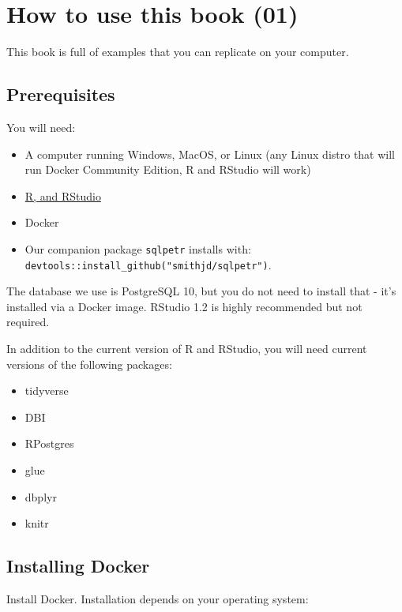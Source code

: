 \documentclass[]{book}
\providecommand{\tightlist}{%
  \setlength{\itemsep}{0pt}\setlength{\parskip}{0pt}}
\theoremstyle{definition}
\theoremstyle{definition}
\theoremstyle{definition}
\theoremstyle{remark}
\begin{document}
\hypertarget{how-to-use-this-book-01}{%
\chapter{How to use this book (01)}\label{how-to-use-this-book-01}}

This book is full of examples that you can replicate on your computer.

\hypertarget{prerequisites}{%
\section{Prerequisites}\label{prerequisites}}

You will need:

\begin{itemize}
\tightlist
\item
  A computer running Windows, MacOS, or Linux (any Linux distro that
  will run Docker Community Edition, R and RStudio will work)
\item
  \href{https://www.datacamp.com/community/tutorials/installing-R-windows-mac-ubuntu}{R,
  and RStudio}
\item
  Docker
\item
  Our companion package \texttt{sqlpetr} installs with:
  \texttt{devtools::install\_github("smithjd/sqlpetr")}.
\end{itemize}

The database we use is PostgreSQL 10, but you do not need to install
that - it's installed via a Docker image. RStudio 1.2 is highly
recommended but not required.

In addition to the current version of R and RStudio, you will need
current versions of the following packages:

\begin{itemize}
\tightlist
\item
  tidyverse
\item
  DBI
\item
  RPostgres
\item
  glue
\item
  dbplyr
\item
  knitr
\end{itemize}

\hypertarget{installing-docker}{%
\section{Installing Docker}\label{installing-docker}}

Install Docker. Installation depends on your operating system:
\end{document}
